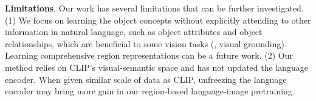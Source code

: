 \smallskip
\noindent \textbf{Limitations}. Our work has several limitations that can be further investigated.
(1) We focus on learning the object concepts without explicitly attending to other information in natural language, such as object attributes and object relationships, which are beneficial to some vision tasks (\eg, visual grounding). Learning comprehensive region representations can be a future work. 
(2) Our method relies on CLIP's visual-semantic space and has not updated the language encoder. When given similar scale of data as CLIP, unfreezing the language encoder may bring more gain in our region-based language-image pretraining. 

